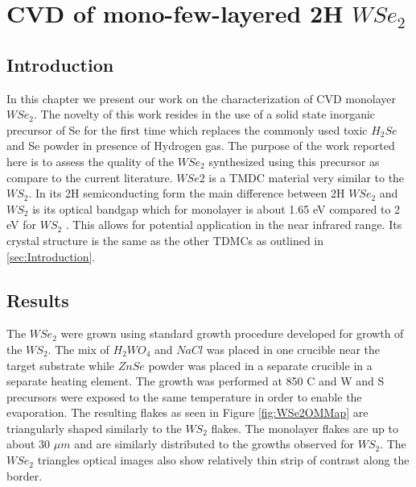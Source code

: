\chapter{CVD of mono-few-layered 2H $WSe_2$}

\section{Introduction}
	
In this chapter we present our work on the characterization of CVD monolayer $WSe_2$. The novelty of this work resides in the use of a solid state inorganic precursor of Se for the first time which replaces the commonly used toxic $H_2Se$ and Se powder in presence of Hydrogen gas.  The purpose of the work reported here is to assess the quality of the $WSe_2$ synthesized using this precursor as compare to the current literature. $WSe2$ is a TMDC material very similar to the $WS_2$. In its 2H semiconducting form the main difference between 2H $WSe_2$ and $WS_2$ is its optical bandgap which for monolayer is about 1.65 eV compared to 2 eV for $WS_2$ . This allows for potential application in the near infrared range. Its crystal structure is the same as the other TDMCs as outlined in \ref{sec:Introduction}.
	
\section{Results}

The $WSe_2$ were grown using standard growth procedure developed for growth of the $WS_2$. The mix of $H_2WO_4$ and $NaCl$ was placed in one crucible near the target substrate while $ZnSe$ powder was placed in a separate crucible in a separate heating element. The growth was performed at 850 {\degree}C and W and S precursors were exposed to the same temperature in order to enable the evaporation. The resulting flakes as seen in Figure \ref{fig:WSe2OMMap} are triangularly shaped similarly to the $WS_2$ flakes. The monolayer flakes are up to about 30 $\mu m$ and are similarly distributed to the growths observed for $WS_2$. The $WSe_2$ triangles optical images also show relatively thin strip of contrast along the border.

